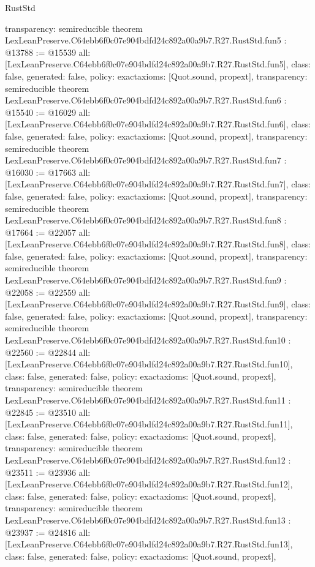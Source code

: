 \begin{lexlean}{RustStd}
\begin{coremodule}
{  transparency: semireducible
}
theorem LexLeanPreserve.C64ebb6f0c07e904bdfd24c892a00a9b7.R27.RustStd.fun5 : @13788 := @15539 {
  all: [LexLeanPreserve.C64ebb6f0c07e904bdfd24c892a00a9b7.R27.RustStd.fun5],
  class: false,
  generated: false,
  policy: exact{axioms: [Quot.sound, propext]},
  transparency: semireducible
}
theorem LexLeanPreserve.C64ebb6f0c07e904bdfd24c892a00a9b7.R27.RustStd.fun6 : @15540 := @16029 {
  all: [LexLeanPreserve.C64ebb6f0c07e904bdfd24c892a00a9b7.R27.RustStd.fun6],
  class: false,
  generated: false,
  policy: exact{axioms: [Quot.sound, propext]},
  transparency: semireducible
}
theorem LexLeanPreserve.C64ebb6f0c07e904bdfd24c892a00a9b7.R27.RustStd.fun7 : @16030 := @17663 {
  all: [LexLeanPreserve.C64ebb6f0c07e904bdfd24c892a00a9b7.R27.RustStd.fun7],
  class: false,
  generated: false,
  policy: exact{axioms: [Quot.sound, propext]},
  transparency: semireducible
}
theorem LexLeanPreserve.C64ebb6f0c07e904bdfd24c892a00a9b7.R27.RustStd.fun8 : @17664 := @22057 {
  all: [LexLeanPreserve.C64ebb6f0c07e904bdfd24c892a00a9b7.R27.RustStd.fun8],
  class: false,
  generated: false,
  policy: exact{axioms: [Quot.sound, propext]},
  transparency: semireducible
}
theorem LexLeanPreserve.C64ebb6f0c07e904bdfd24c892a00a9b7.R27.RustStd.fun9 : @22058 := @22559 {
  all: [LexLeanPreserve.C64ebb6f0c07e904bdfd24c892a00a9b7.R27.RustStd.fun9],
  class: false,
  generated: false,
  policy: exact{axioms: [Quot.sound, propext]},
  transparency: semireducible
}
theorem LexLeanPreserve.C64ebb6f0c07e904bdfd24c892a00a9b7.R27.RustStd.fun10 : @22560 := @22844 {
  all: [LexLeanPreserve.C64ebb6f0c07e904bdfd24c892a00a9b7.R27.RustStd.fun10],
  class: false,
  generated: false,
  policy: exact{axioms: [Quot.sound, propext]},
  transparency: semireducible
}
theorem LexLeanPreserve.C64ebb6f0c07e904bdfd24c892a00a9b7.R27.RustStd.fun11 : @22845 := @23510 {
  all: [LexLeanPreserve.C64ebb6f0c07e904bdfd24c892a00a9b7.R27.RustStd.fun11],
  class: false,
  generated: false,
  policy: exact{axioms: [Quot.sound, propext]},
  transparency: semireducible
}
theorem LexLeanPreserve.C64ebb6f0c07e904bdfd24c892a00a9b7.R27.RustStd.fun12 : @23511 := @23936 {
  all: [LexLeanPreserve.C64ebb6f0c07e904bdfd24c892a00a9b7.R27.RustStd.fun12],
  class: false,
  generated: false,
  policy: exact{axioms: [Quot.sound, propext]},
  transparency: semireducible
}
theorem LexLeanPreserve.C64ebb6f0c07e904bdfd24c892a00a9b7.R27.RustStd.fun13 : @23937 := @24816 {
  all: [LexLeanPreserve.C64ebb6f0c07e904bdfd24c892a00a9b7.R27.RustStd.fun13],
  class: false,
  generated: false,
  policy: exact{axioms: [Quot.sound, propext]},
}
\end{coremodule}
\end{lexlean}
